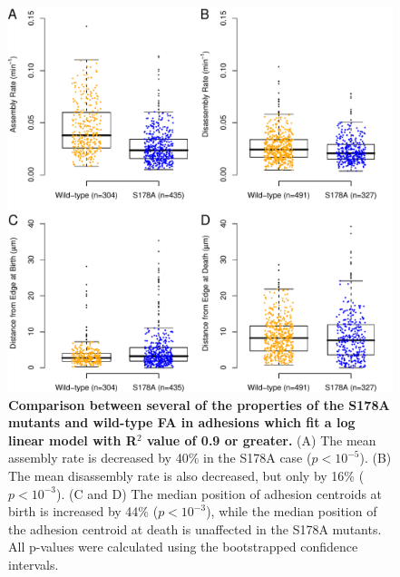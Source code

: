 \documentclass[letterpaper,draft]{article}
\begin{document}
\begin{figure}[htbp]
\begin{center}
\includegraphics[width=\textwidth]{../figures/S178A/S178A_vs_wild-type}
\caption{
{\bf Comparison between several of the properties of the S178A mutants and wild-type FA in adhesions which fit a log linear model with R$^2$ value of 0.9 or greater.} (A) The mean assembly rate is decreased by 40\% in the S178A case ($p<10^{-5}$). (B) The mean disassembly rate is also decreased, but only by 16\% ($p<10^{-3}$). (C and D) The median position of adhesion centroids at birth is increased by 44\% ($p<10^{-3}$), while the median position of the adhesion centroid at death is unaffected in the S178A mutants. All p-values were calculated using the bootstrapped confidence intervals.
}
\label{S178A}
\end{center}
\end{figure}
\end{document}
